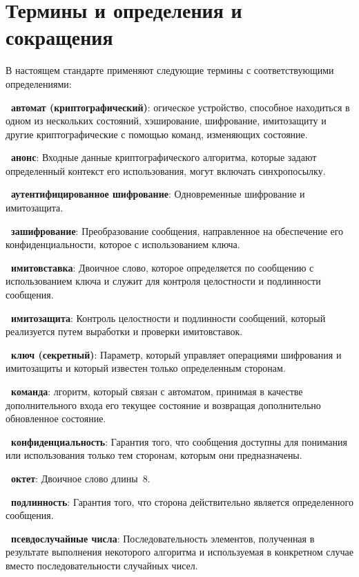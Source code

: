 \chapter{Термины и определения и сокращения}

В настоящем стандарте применяют
следующие термины с соответствующими определениями:

{\bf \thedefctr~автомат (криптографический)}:
огическое устройство, способное находиться в одном из нескольких 
состояний,  хэширование, шифрование, имитозащиту и другие 
криптографические  с помощью команд, изменяющих 
состояние.

{\bf \thedefctr~анонс}:
Входные данные криптографического алгоритма,
которые задают определенный контекст его использования,
могут включать синхропосылку.

{\bf \thedefctr~аутентифицированное шифрование}:
Одновременные шифрование и имитозащита.

{\bf \thedefctr~зашифрование}:
Преобразование сообщения,
направленное на обеспечение его конфиденциальности,
которое  с использованием ключа.

{\bf \thedefctr~имитовставка}:
Двоичное слово, 
которое определяется по сообщению с использованием ключа 
и служит для контроля целостности и подлинности сообщения.

{\bf \thedefctr~имитозащита}:
Контроль целостности и подлинности сообщений, 
который реализуется путем выработки и проверки имитовставок.

{\bf \thedefctr~ключ (секретный)}:
Параметр, который управляет операциями шифрования 
и имитозащиты и который известен только определенным сторонам.

{\bf \thedefctr~команда}:
лгоритм, который связан с автоматом, принимая 
в качестве дополнительного входа его текущее состояние
и возвращая дополнительно обновленное состояние.

{\bf \thedefctr~конфиденциальность}:
Гарантия того, что сообщения доступны для понимания или использования
только тем сторонам, которым они предназначены.

{\bf \thedefctr~октет}:
Двоичное слово длины~$8$.

{\bf \thedefctr~подлинность}:
Гарантия того, что сторона действительно является
 определенного сообщения.

{\bf \thedefctr~псевдослучайные числа}: 
Последовательность элементов, полученная в результате выполнения некоторого
алгоритма и используемая в конкретном случае вместо последовательности случайных
чисел.

